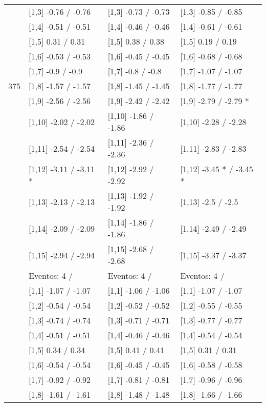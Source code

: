 \begin{table}
\begin{tabular}[t]{llll}
 & {}[1,3] -0.76  / -0.76 & {}[1,3] -0.73  / -0.73 & {}[1,3] -0.85  / -0.85\\
\addlinespace
 & {}[1,4] -0.51  / -0.51 & {}[1,4] -0.46  / -0.46 & {}[1,4] -0.61  / -0.61\\
 & {}[1,5] 0.31  / 0.31 & {}[1,5] 0.38  / 0.38 & {}[1,5] 0.19  / 0.19\\
 & {}[1,6] -0.53  / -0.53 & {}[1,6] -0.45  / -0.45 & {}[1,6] -0.68  / -0.68\\
 & {}[1,7] -0.9  / -0.9 & {}[1,7] -0.8  / -0.8 & {}[1,7] -1.07  / -1.07\\
375 & {}[1,8] -1.57  / -1.57 & {}[1,8] -1.45  / -1.45 & {}[1,8] -1.77  / -1.77\\
\addlinespace
 & {}[1,9] -2.56  / -2.56 & {}[1,9] -2.42  / -2.42 & {}[1,9] -2.79  / -2.79 *\\
 & {}[1,10] -2.02  / -2.02 & {}[1,10] -1.86  / -1.86 & {}[1,10] -2.28  / -2.28\\
 & {}[1,11] -2.54  / -2.54 & {}[1,11] -2.36  / -2.36 & {}[1,11] -2.83  / -2.83\\
 & {}[1,12] -3.11  / -3.11 * & {}[1,12] -2.92  / -2.92 & {}[1,12] -3.45 * / -3.45 *\\
 & {}[1,13] -2.13  / -2.13 & {}[1,13] -1.92  / -1.92 & {}[1,13] -2.5  / -2.5\\
\addlinespace
 & {}[1,14] -2.09  / -2.09 & {}[1,14] -1.86  / -1.86 & {}[1,14] -2.49  / -2.49\\
 & {}[1,15] -2.94  / -2.94 & {}[1,15] -2.68  / -2.68 & {}[1,15] -3.37  / -3.37\\
 & Eventos:  4 / & Eventos:  4 / & Eventos:  4 /\\
 & {}[1,1] -1.07  / -1.07 & {}[1,1] -1.06  / -1.06 & {}[1,1] -1.07  / -1.07\\
 & {}[1,2] -0.54  / -0.54 & {}[1,2] -0.52  / -0.52 & {}[1,2] -0.55  / -0.55\\
\addlinespace
 & {}[1,3] -0.74  / -0.74 & {}[1,3] -0.71  / -0.71 & {}[1,3] -0.77  / -0.77\\
 & {}[1,4] -0.51  / -0.51 & {}[1,4] -0.46  / -0.46 & {}[1,4] -0.54  / -0.54\\
 & {}[1,5] 0.34  / 0.34 & {}[1,5] 0.41  / 0.41 & {}[1,5] 0.31  / 0.31\\
 & {}[1,6] -0.54  / -0.54 & {}[1,6] -0.45  / -0.45 & {}[1,6] -0.58  / -0.58\\
 & {}[1,7] -0.92  / -0.92 & {}[1,7] -0.81  / -0.81 & {}[1,7] -0.96  / -0.96\\
\addlinespace
500 & {}[1,8] -1.61  / -1.61 & {}[1,8] -1.48  / -1.48 & {}[1,8] -1.66  / -1.66\\

\end{tabular}
\end{table}
